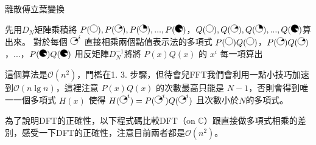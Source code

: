 \begin{algorithm} \small%
	\caption{離散傅立葉變換}
	\label{alg:FFT:DFT}
	\begin{algorithmic}[1]
		\State 先用$D_N$矩陣乘積將 $P(\pie{0}),P(\pie{45}),P(\pie{90}),...,P(\pie{315})$，$Q(\pie{0}),Q(\pie{45}),Q(\pie{90}),...,Q(\pie{315})$算出來。
		\State 對於每個 $\pie{45}^i$ 直接相乘兩個點值表示法的多項式 $P(\pie{0})Q(\pie{0})$，$P(\pie{45})Q(\pie{45})$，...，$P(\pie{315})Q(\pie{315})$
		\State  用反矩陣$D_N^{-1}$將將 $P(x)Q(x)$ 的 $x^i$ 每一項算出
		\end{algorithmic}
\end{algorithm}


這個算法是$\mathcal{O}(n^2)$，門檻在1. 3. 步驟，但待會兒FFT我們會利用一點小技巧加速到$\mathcal{O}(n\lg n)$，這裡注意 $P(x) Q(x)$ 的次數最高只能是 $N-1$，否則會得到唯一一個多項式 $H(x)$ 使得 $H(\pie{45}^i)=P(\pie{45}^i)Q(\pie{45}^i)$ 且次數小於$N$的多項式。

為了說明DFT的正確性，以下程式碼比較DFT（on $\mathbb{C}$）跟直接做多項式相乘的差別，感受一下DFT的正確性，注意目前兩者都是$\mathcal{O}(n^2)$。

